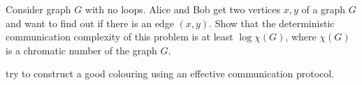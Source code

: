 Consider graph $G$ with no loops. Alice and Bob get two vertices $x, y$ of a graph $G$ and want to find
out if there is an edge $(x, y)$. Show that the deterministic communication complexity of this problem
is at least $\log \chi(G)$, where $\chi(G)$ is a chromatic number of the graph $G$.

 try to construct a good colouring using an effective communication protocol.